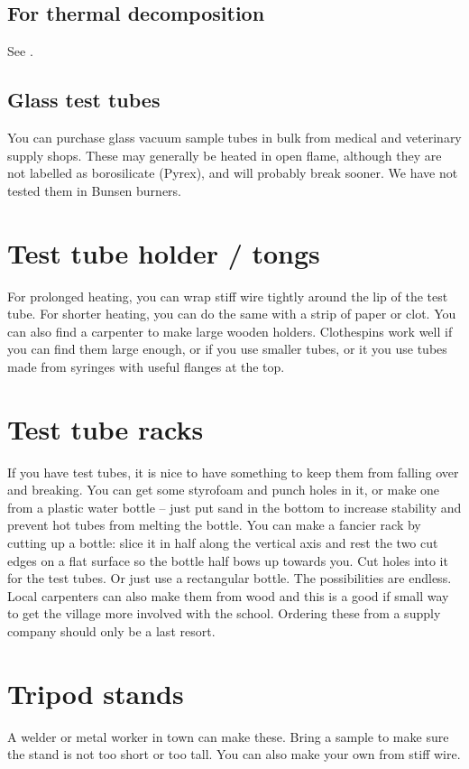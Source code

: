 \subsection{For thermal decomposition}
See .

\subsection{Glass test tubes}
You can purchase glass vacuum sample tubes 
in bulk from medical and veterinary supply shops. 
These may generally be heated in open flame, 
although they are not labelled as borosilicate (Pyrex), 
and will probably break sooner. 
We have not tested them in Bunsen burners.

\section{Test tube holder / tongs}
For prolonged heating, 
you can wrap stiff wire tightly around the lip of the test tube. 
For shorter heating, 
you can do the same with a strip of paper or clot. 
You can also find a carpenter to make large wooden holders. 
Clothespins work well if you can find them large enough, 
or if you use smaller tubes, 
or it you use tubes made from syringes with useful flanges at the top.

\section{Test tube racks}
If you have test tubes, 
it is nice to have something to keep them from falling over and breaking. 
You can get some styrofoam and punch holes in it, 
or make one from a plastic water bottle -- 
just put sand in the bottom to increase stability 
and prevent hot tubes from melting the bottle. 
You can make a fancier rack by cutting up a bottle: 
slice it in half along the vertical axis 
and rest the two cut edges on a flat surface 
so the bottle half bows up towards you. 
Cut holes into it for the test tubes. 
Or just use a rectangular bottle. 
The possibilities are endless. 
Local carpenters can also make them from wood 
and this is a good if small way 
to get the village more involved with the school. 
Ordering these from a supply company should only be a last resort. 

\section{Tripod stands}
A welder or metal worker in town can make these. 
Bring a sample to make sure the stand is not too short or too tall. 
You can also make your own from stiff wire.

